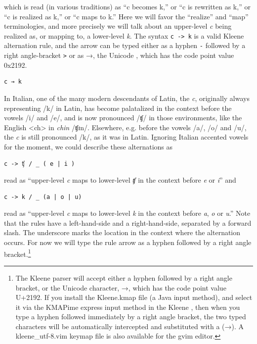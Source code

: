 \noindent
which is read (in various traditions) as ``c becomes k,'' or ``c is rewritten as k,'' or ``c is realized
as k,'' or ``c
maps to k.''  Here we will favor the ``realize'' and ``map'' terminologies, and more precisely we will
talk about an upper-level \emph{c} being realized as, or mapping to, a lower-level \emph{k}.  The syntax
\texttt{c -> k} is a valid Kleene alternation rule, and the arrow can be typed either as a hyphen \texttt{-} followed
by a right angle-bracket \texttt{>} or as →, the Unicode
,
which has the code point value 0x2192.

\begin{Verbatim}
c → k
\end{Verbatim}


In Italian, one of the many modern descendants of Latin, the \emph{c},
originally always representing /k/ in Latin, has become palatalized in the context before the vowels /i/ and
/e/, and is now pronounced /ʧ/ in those environments, like the English
<ch> in \emph{chin} /ʧɪn/.  Elsewhere, e.g.\@
before the vowels /a/, /o/ and /u/, the \emph{c} is still pronounced /k/,
as it was in Latin.  Ignoring Italian accented vowels for the moment, we could
describe these alternations as 

\begin{Verbatim}
c -> ʧ / _ ( e | i )
\end{Verbatim}

\noindent
read as ``upper-level \emph{c} maps to lower-level \emph{ʧ} in the context before \emph{e} or \emph{i}'' and

\begin{Verbatim}
c -> k / _ (a | o | u)
\end{Verbatim}

\noindent
read as ``upper-level \emph{c} maps to lower-level \emph{k} in the context before \emph{a}, \emph{o} or \emph{u}.''
Note that the rules have a left-hand-side and a right-hand-side, separated by a forward slash.  The underscore marks
the location in the context where the alternation occurs.  For now we
will type the rule arrow as a hyphen followed by a
right angle bracket.\footnote{The Kleene parser will accept either a hyphen
followed by a right angle bracket, or the Unicode  character, →, which has the code point value U+2192.  If you
install the Kleene.kmap file (a Java input method), and select
it via the KMAPime express input method in the Kleene , then when you type a hyphen followed immediately by a
right angle bracket, the two typed characters will be automatically
intercepted and substituted with a  (→).  A
kleene\_utf-8.vim keymap file is also available for the gvim editor.}

